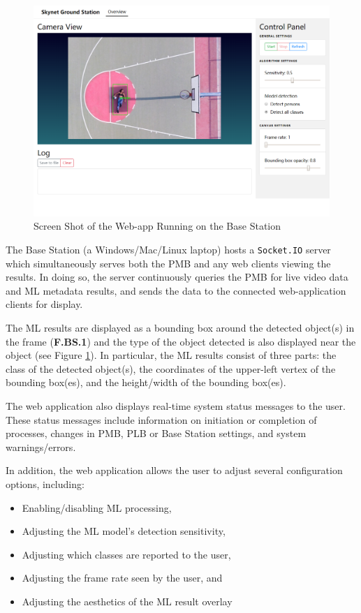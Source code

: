 \begin{figure}[H]
\begin{mdframed}
\centering
\includegraphics[width=15cm]{img/base_station.png}
\end{mdframed}
\caption{Screen Shot of the Web-app Running on the Base Station}
\label{basestationdiag}
\end{figure}

The Base Station (a Windows/Mac/Linux laptop) hosts a \texttt{Socket.IO} server which simultaneously serves both the PMB and any web clients viewing the results. In doing so, the server continuously queries the PMB for live video data and ML metadata results, and sends the data to the connected web-application clients for display.

The ML results are displayed as a bounding box around the detected object(s) in the frame (\textbf{F.BS.1}) and the type of the object detected is also displayed near the object (see Figure \ref{basestationdiag}). In particular, the ML results consist of three parts: the class of the detected object(s), the coordinates of the upper-left vertex of the bounding box(es), and the height/width of the bounding box(es).

The web application also displays real-time system status messages to the user. These status messages include information on initiation or completion of processes, changes in PMB, PLB or Base Station settings, and system warnings/errors.

In addition, the web application allows the user to adjust several configuration options, including:

\begin{itemize}
\item Enabling/disabling ML processing,
\item Adjusting the ML model's detection sensitivity,
\item Adjusting which classes are reported to the user,
\item Adjusting the frame rate seen by the user, and
\item Adjusting the aesthetics of the ML result overlay
\end{itemize}

